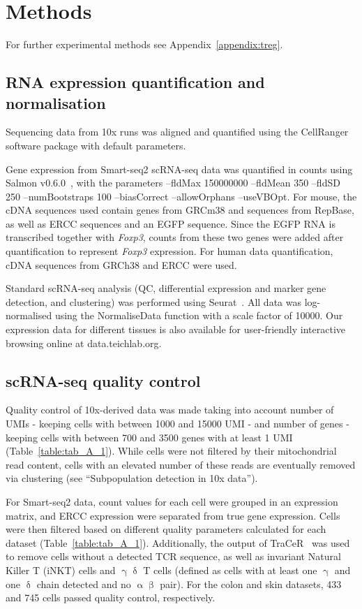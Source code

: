 \section{Methods}
\label{section2.9}

For further experimental methods see Appendix~\ref{appendix:treg}.

\subsection{RNA expression quantification and normalisation}
Sequencing data from 10x runs was aligned and quantified using the CellRanger software package with default parameters.

Gene expression from Smart-seq2 scRNA-seq data was quantified in counts using Salmon v0.6.0~\citep{Patro2017-ce}, with the parameters --fldMax 150000000 --fldMean 350 --fldSD 250 --numBootstraps 100 --biasCorrect --allowOrphans --useVBOpt. For mouse, the cDNA sequences used contain genes from GRCm38 and sequences from RepBase, as well as ERCC sequences and an EGFP sequence. Since the EGFP RNA is transcribed together with \textit{Foxp3}, counts from these two genes were added after quantification to represent \textit{Foxp3} expression. For human data quantification, cDNA sequences from GRCh38 and ERCC were used.

Standard scRNA-seq analysis (QC, differential expression and marker gene detection, and clustering) was performed using Seurat~\citep{Satija2015-ti}. All data was log-normalised using the NormaliseData function with a scale factor of 10000. Our expression data for different tissues is also available for user-friendly interactive browsing online at data.teichlab.org.

\subsection{scRNA-seq quality control}
Quality control of 10x-derived data was made taking into account number of UMIs - keeping cells with between 1000 and 15000 UMI - and number of genes - keeping cells with between 700 and 3500 genes with at least 1 UMI (Table~\ref{table:tab_A_1}). While cells were not filtered by their mitochondrial read content, cells with an elevated number of these reads are eventually removed via clustering (see “Subpopulation detection in 10x data”).

For Smart-seq2 data, count values for each cell were grouped in an expression matrix, and ERCC expression were separated from true gene expression. Cells were then filtered based on different quality parameters calculated for each dataset (Table~\ref{table:tab_A_1}). Additionally, the output of TraCeR~\citep{stubbington_t_2016} was used to remove cells without a detected TCR sequence, as well as invariant Natural Killer T (iNKT) cells and ${\upgamma\updelta}$ T cells (defined as cells with at least one ${\upgamma}$ and one ${\updelta}$ chain detected and no ${\upalpha\upbeta}$ pair). For the colon and skin datasets, 433 and 745 cells passed quality control, respectively.

